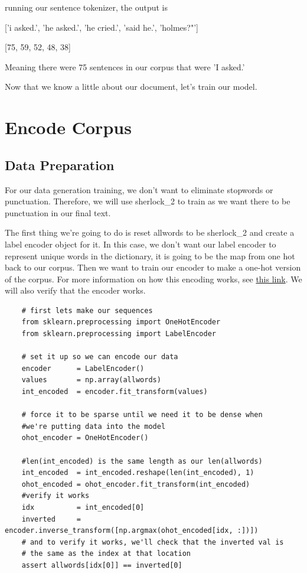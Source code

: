 \documentclass{article}
\begin{document}
running our sentence tokenizer, the output is 

['i asked.', 'he asked.', 'he cried.', 'said he.', 'holmes?"']

[75, 59, 52, 48, 38]

Meaning there were 75 sentences in our corpus that were 'I asked.' 

Now that we know a little about our document, let's train our model.

 \section{Encode Corpus}
 
 \subsection{Data Preparation}
 For our data generation training, we don't want to eliminate stopwords or punctuation. Therefore, we will use sherlock\_2 to train as we want there to be punctuation in our final text. 
 
 The first thing we're going to do is reset allwords to be sherlock\_2 and create a label encoder object for it. In this case, we don't want our label encoder to represent unique words in the dictionary, it is going to be the map from one hot back to our corpus. Then we want to train our encoder to make a one-hot version of the corpus. For more information on how this encoding works, see \href{https://machinelearningmastery.com/how-to-one-hot-encode-sequence-data-in-python/}{this link}. We will also verify that the encoder works. 
 
 
 \begin{verbatim}
    # first lets make our sequences
    from sklearn.preprocessing import OneHotEncoder
    from sklearn.preprocessing import LabelEncoder

    # set it up so we can encode our data
    encoder      = LabelEncoder()
    values       = np.array(allwords)
    int_encoded  = encoder.fit_transform(values)

    # force it to be sparse until we need it to be dense when 
    #we're putting data into the model
    ohot_encoder = OneHotEncoder()

    #len(int_encoded) is the same length as our len(allwords)
    int_encoded  = int_encoded.reshape(len(int_encoded), 1) 
    ohot_encoded = ohot_encoder.fit_transform(int_encoded)
    #verify it works
    idx          = int_encoded[0]
    inverted     = encoder.inverse_transform([np.argmax(ohot_encoded[idx, :])])
    # and to verify it works, we'll check that the inverted val is
    # the same as the index at that location
    assert allwords[idx[0]] == inverted[0]
 \end{verbatim}
 
\end{document}
